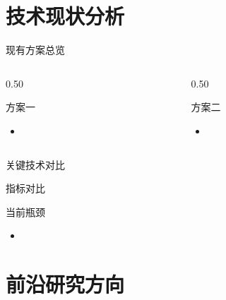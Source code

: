 \documentclass[aspectratio=169, 8pt, UTF8]{ctexbeamer}
\begin{document}
\section{技术现状分析}

\begin{frame}{现有方案总览}
  \begin{columns}[T]
    \begin{column}{0.50\textwidth}
      \begin{block}{方案一}
        \begin{itemize}
          \item
        \end{itemize}
      \end{block}
    \end{column}
    \begin{column}{0.50\textwidth}
      \begin{block}{方案二}
        \begin{itemize}
          \item
        \end{itemize}
      \end{block}
    \end{column}
  \end{columns}
\end{frame}

\begin{frame}{关键技术对比}
  \begin{block}{指标对比}
  \end{block}
\end{frame}

\begin{frame}{当前瓶颈}
  \begin{alertblock}{}
    \begin{itemize}
      \item
    \end{itemize}
  \end{alertblock}
\end{frame}

\section{前沿研究方向}
\end{document}
